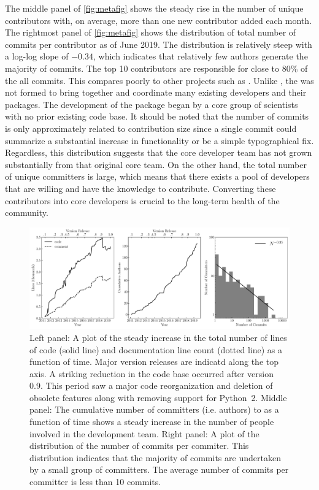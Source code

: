 The middle panel of \autoref{fig:metafig} shows the steady rise in the number of unique contributors with, on average, more than one new contributor added each month.
The rightmost panel of \autoref{fig:metafig} shows the distribution of total number of commits per contributor as of June 2019.
The distribution is relatively steep with a log-log slope of $-0.34$, which indicates that relatively few authors generate the majority of commits.
The top 10 contributors are responsible for close to 80\% of the all commits.
This compares poorly to other projects such as \astropy \citep{astropy2018}.
Unlike \astropy, the \sunpyproj was not formed to bring together and coordinate many existing developers and their \python packages.
The development of the \sunpypkg package began by a core group of scientists with no prior existing code base.
It should be noted that the number of commits is only approximately related to contribution size since a single commit could summarize a substantial increase in functionality or be a simple typographical fix.
Regardless, this distribution suggests that the core developer team has not grown substantially from that original core team.
On the other hand, the total number of unique committers is large, which means that there exists a pool of \sunpypkg developers that are willing and have the knowledge to contribute.
Converting these contributors into core developers is crucial to the long-term health of the community.


\begin{figure}
    \center
    \includegraphics[width = 1.0\textwidth]{figures/dev_meta.pdf}
    \caption{Left panel: A plot of the steady increase in the total number of lines of code (solid line) and documentation line count (dotted line) as a function of time.
	Major version releases are indicatd along the top axis.
	A striking reduction in the code base occurred after version 0.9.
	This period saw a major code reorganization and deletion of obsolete features along with removing support for Python~2.
	Middle panel: The cumulative number of committers (i.e. authors) to \sunpypkg as a function of time shows a steady increase in the number of people involved in the development team.
	Right panel: A plot of the distribution of the number of commits per commiter.
	This distribution indicates that the majority of commits are undertaken by a small group of committers. The average number of commits per committer is less than 10 commits.}
\label{fig:metafig}
\end{figure}
